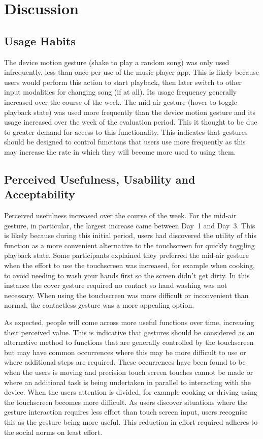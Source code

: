 \documentclass{l4proj}
\begin{document}
\section{Discussion} 

\subsection{Usage Habits}

The device motion gesture (shake to play a random song) was only used infrequently, less than once per use of the music player app. This is likely because users would perform this action to start playback, then later switch to other input modalities for changing song (if at all). Its usage frequency generally increased over the course of the week. The mid-air gesture (hover to toggle playback state) was used more frequently than the device motion gesture and its usage increased over the week of the evaluation period. This it thought to be due to greater demand for access to this functionality. This indicates that gestures should be designed to control functions that users use more frequently as this may increase the rate in which they will become more used to using them.

\subsection{Perceived Usefulness, Usability and Acceptability}

Perceived usefulness increased over the course of the week. For the mid-air gesture, in particular, the largest increase came between Day~1 and Day~3. This is likely because during this initial period, users had discovered the utility of this function as a more convenient alternative to the touchscreen for quickly toggling playback state. Some participants explained they preferred the mid-air gesture when the effort to use the touchscreen was increased, for example when cooking, to avoid needing to wash your hands first so the screen didn't get dirty. In this instance the cover gesture required no contact so hand washing was not necessary. When using the touchscreen was more difficult or inconvenient than normal, the contactless gesture was a more appealing option.

As expected, people will come across more useful functions over time, increasing their perceived value. This is indicative that gestures should be considered as an alternative method to functions that are generally controlled by the touchscreen but may have common occurrences where this may be more difficult to use or where additional steps are required. These occurrences have been found to be when the users is moving and precision touch screen touches cannot be made or where an additional task is being undertaken in parallel to interacting with the device. When the users attention is divided, for example cooking or driving using the touchscreen becomes more difficult. As users discover situations where the gesture interaction requires less effort than touch screen input, users recognise this as the gesture being more useful. This reduction in effort required adheres to the social norms on least effort.
\end{document}

